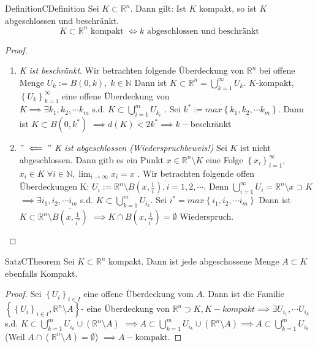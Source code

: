 \begin{ibox}[21]{Definition}{CDefinition}
    Sei $ K \subset \mathbb{R}^n  $. Dann gilt: Ist $ K $ kompakt, so ist $ K $ abgeschlossen und
	beschränkt.
	$$ K \subset  \mathbb{R}^n \text{ kompakt } \iff k \text{ abgeschlossen und beschränkt}  $$
\end{ibox}

\begin{proof}
\begin{enumerate}[label=\alph*)]
	\item \textit{ K ist beschränkt}. Wir betrachten folgende Überdeckung von $ \mathbb{R}^n  $ bei
		offene Menge $ U_{k} := B(0,k), \; k \in \mathbb{N}  $ Dann ist $ K \subset \mathbb{R}^n 
		= \bigcup\limits_{k = 1}^{\infty} U_{k} $. $ K $-kompakt,
		$ \left\{ U_{k} \right\}_{k=1}^{\infty} $ eine offene Überdeckung von $ K \implies \exists 
		k_1, k_2, \cdots k_{m} \text{ s.d. } K \subset  \bigcup\limits_{i=1}^{m} U_{k_{i}} $ .
		Sei $ k^{*} := max \left\{ k_1, k_2, \cdots k_{m} \right\}  $. Dann ist $ K \subset B(0,k^*)$ 
		$ \implies  d(K) < 2k^* \implies k- $beschränkt 
	\item $ " \impliedby" $ \textit{K ist abgeschlossen (Wiederspruchbeweis!)} Sei $ K $ ist nicht
		abgeschlossen. Dann gitb es ein Punkt $ x \in \mathbb{R}^n \setminus K $ eine Folge
		$ \left\{ x_{i} \right\}_{i=1}^\infty $, $ x_{i} \in K \; \forall i \in  \mathbb{N}
		, \lim_{i \to
		\infty} x_i = x$ . Wir betrachten folgende offen Überdeckungen K:
		$ U_i := \mathbb{R}^n  \setminus \overline{B \left( x, \frac{1}{i}  \right) ,
		i = 1, 2 , \cdots}   $. Denn $ \bigcup\limits_{i=1}^{\infty} U_i = \mathbb{R}^n \setminus
		{x} \supset K $ $ \implies \exists i_1,i_2, \cdots i_{m} $ s.d. $ K \subset
		\bigcup\limits_{k=1}^{m} U_{i_{k}} $. Sei $ i^* = max \left\{ i_1,i_2, \cdots i_{m} \right\}$
		Dann ist $ K \subset \mathbb{R}^n \setminus \overline{B \left( x, \frac{1}{i^*}  \right) } $ 
		$ \implies K \cap B \left( x, \frac{1}{i^*}  \right) = \emptyset  $ Wiederspruch.
\end{enumerate}
\end{proof}

\begin{ibox}[22]{Satz}{CTheorem}
    Sei $ K \subset  \mathbb{R}^n  $ kompakt. Dann ist jede abgeschossene Menge $ A \subset K $ 
	ebenfalls Kompakt.
\end{ibox}
\begin{proof}
	Sei $ \left\{ U_i \right\}_{i \in  I} $ eine offene Überdeckung vom $ A $. Dann ist die Familie
	$ \left\{ \left\{ U_i \right\}_{i \in  I}, \mathbb{R}^n \setminus A \right\}  $- eine Überdeckung
	von $ \mathbb{R}^n \supset K, K-kompakt \implies \exists U_{i_{1}}, \cdots U_{i_{k}} $ 
	s.d. $ K \subset  \bigcup\limits_{k=1}^{m} U_{i_{k}} \cup \left( \mathbb{R}^n \setminus A \right)$
	$ \implies A \subset  \bigcup\limits_{k=1}^{m} U_{i_{k}} \cup \left( \mathbb{R}^n \setminus
	A \right) \implies A \subset \bigcup\limits_{k=1}^{m} U_{i_{k}}   $ (Weil $ A \cap 
	\left( \mathbb{R}^n \setminus A \right) = \emptyset $) $ \implies A- $kompakt. 
\end{proof}

